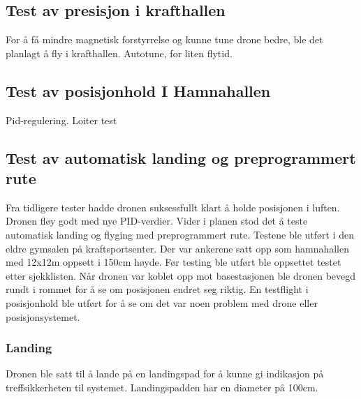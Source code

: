 \subsection{Test av presisjon i krafthallen}
For å få mindre magnetisk forstyrrelse og kunne tune drone bedre, ble det planlagt å fly i krafthallen. 
Autotune, for liten flytid. 

\subsection{Test av posisjonhold I Hamnahallen}
Pid-regulering. 
Loiter test

\subsection{Test av automatisk landing og preprogrammert rute}
Fra tidligere tester hadde dronen suksessfullt klart å holde posisjonen i luften. 
Dronen fløy godt med nye PID-verdier. Vider i planen stod det å teste automatisk landing og flyging med preprogrammert rute. 
Testene ble utført i den eldre gymsalen på kraftsportsenter. 
Der var ankerene satt opp som hamnahallen med 12x12m oppsett i 150cm høyde. 
Før testing ble utført ble oppsettet testet etter sjekklisten. 
Når dronen var koblet opp mot basestasjonen ble dronen bevegd rundt i rommet for å se om posisjonen endret seg riktig. 
En testflight i posisjonhold ble utført for å se om det var noen problem med drone eller posisjonsystemet.  

\subsubsection{Landing}
Dronen ble satt til å lande på en landingspad for å kunne gi indikasjon på treffsikkerheten til systemet. Landingspadden har en diameter på 100cm. 
